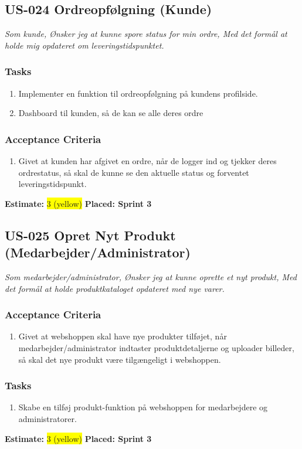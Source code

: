 \subsection{US-024 Ordreopfølgning (Kunde)}
\label{sec:US-024}
\textit{Som kunde, Ønsker jeg at kunne spore status for min ordre, Med det formål at holde mig opdateret om leveringstidspunktet.}
\subsubsection*{\textbf{Tasks}}
\begin{enumerate}
  \item Implementer en funktion til ordreopfølgning på kundens profilside.
  \item Dashboard til kunden, så de kan se alle deres ordre
\end{enumerate}
\subsubsection*{\textbf{Acceptance Criteria}}
\begin{enumerate}
  \item Givet at kunden har afgivet en ordre, når de logger ind og tjekker deres ordrestatus, så skal de kunne se den aktuelle status og forventet leveringstidspunkt.
\end{enumerate}
\textbf{Estimate:} \colorbox{yellow}{3 (yellow)}
\textbf{Placed: Sprint 3}
\par\noindent\dotfill

\subsection{US-025 Opret Nyt Produkt (Medarbejder/Administrator)}
\label{sec:US-025}
\textit{Som medarbejder/administrator, Ønsker jeg at kunne oprette et nyt produkt, Med det formål at holde produktkataloget opdateret med nye varer.}
\subsubsection*{\textbf{Acceptance Criteria}}
\begin{enumerate}
  \item Givet at webshoppen skal have nye produkter tilføjet, når medarbejder/administrator indtaster produktdetaljerne og uploader billeder, så skal det nye produkt være tilgængeligt i webshoppen.
\end{enumerate}
\subsubsection*{\textbf{Tasks}}
\begin{enumerate}
  \item Skabe en tilføj produkt-funktion på webshoppen for medarbejdere og administratorer.
\end{enumerate}
\textbf{Estimate:} \colorbox{yellow}{3 (yellow)}
\textbf{Placed: Sprint 3}
\par\noindent\dotfill

